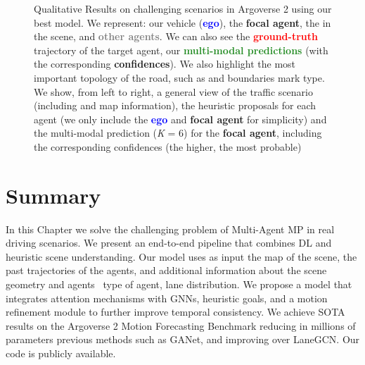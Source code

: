 \begin{figure}[h]
	\caption[Qualitative Results on challenging scenarios in Argoverse 2 using our best model]{Qualitative Results on challenging scenarios in Argoverse 2 using our best model. We represent: our vehicle (\textbf{\textcolor{blue}{ego}}), the \textbf{\textcolor{YellowOrange}{focal agent}}, the \textbf{\color{blue-violet}{relevant agents}} in the scene, and \textbf{\textcolor{gray}{other agents}}. We can also see the \textbf{\textcolor{red}{ground-truth}} trajectory of the target agent, our \textbf{\textcolor{ForestGreen}{multi-modal predictions}} (with the corresponding \textbf{confidences}). We also highlight the most important topology of the road, such as {\color{blue-violet}{pedestrian crossing}} and boundaries mark type. We show, from left to right, a general view of the traffic scenario (including and map information), the heuristic proposals for each agent (we only include the \textbf{\textcolor{blue}{ego}} and \textbf{\textcolor{YellowOrange}{focal agent}} for simplicity) and the multi-modal prediction (\textit{K} = 6) for the \textbf{\textcolor{YellowOrange}{focal agent}}, including the corresponding confidences (the higher, the most probable)}
	\label{fig:chapter_7_Improving_Multi_Agent/argoverse_2_qualitative_results}
\end{figure}

\section{Summary}
\label{sec:7_summary}

In this Chapter we solve the challenging problem of Multi-Agent \ac{MP} in real driving scenarios. We present an end-to-end pipeline that combines \ac{DL} and heuristic scene understanding. Our model uses as input the map of the scene, the past trajectories of the agents, and additional information about the scene geometry and agents \eg \, type of agent, lane distribution. We propose a model that integrates attention mechanisms with \acp{GNN}, heuristic goals, and a motion refinement module to further improve temporal consistency. We achieve \ac{SOTA} results on the Argoverse 2 Motion Forecasting Benchmark reducing in millions of parameters previous methods such as GANet, and improving over LaneGCN. Our code is publicly available. %